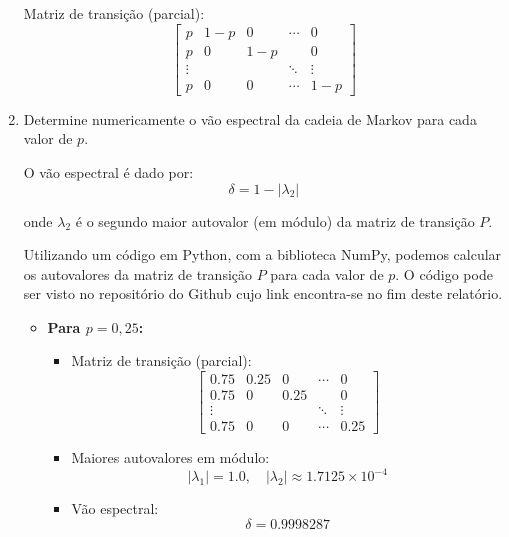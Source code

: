 \begin{enumerate}
\begin{resposta}
        Matriz de transição (parcial):
                $$
                \begin{bmatrix}
                p & 1-p & 0    & \cdots & 0 \\
                p & 0    & 1-p &        & 0 \\
                \vdots &     &     & \ddots & \vdots \\
                p & 0    & 0    & \cdots & 1-p
                \end{bmatrix}
                $$

    \end{resposta}
    \item Determine numericamente o vão espectral da cadeia de Markov para cada valor de $p$.
    \begin{resposta}

        O vão espectral é dado por:
        $$\delta = 1 - |\lambda_2| $$
        
            onde $\lambda_2$ é o segundo maior autovalor (em módulo) da matriz de transição $P$.

        Utilizando um código em Python, com a biblioteca NumPy, podemos calcular os autovalores da matriz de transição $P$ para cada valor de $p$. O código pode ser visto no repositório do Github cujo link encontra-se no fim deste relatório.

        \begin{itemize}        
            \item \textbf{Para $p = 0{,}25$:}
            \begin{itemize}
                \item Matriz de transição (parcial):
                $$
                \begin{bmatrix}
                0.75 & 0.25 & 0    & \cdots & 0 \\
                0.75 & 0    & 0.25 &        & 0 \\
                \vdots &     &     & \ddots & \vdots \\
                0.75 & 0    & 0    & \cdots & 0.25
                \end{bmatrix}
                $$
                \item Maiores autovalores em módulo:
                $$ |\lambda_1| = 1.0, \quad |\lambda_2| \approx 1.7125 \times 10^{-4} $$
                \item Vão espectral:
                $$ \boxed{\delta = 0.9998287} $$
            \end{itemize}
        

\end{itemize}
\end{resposta}
\end{enumerate}

